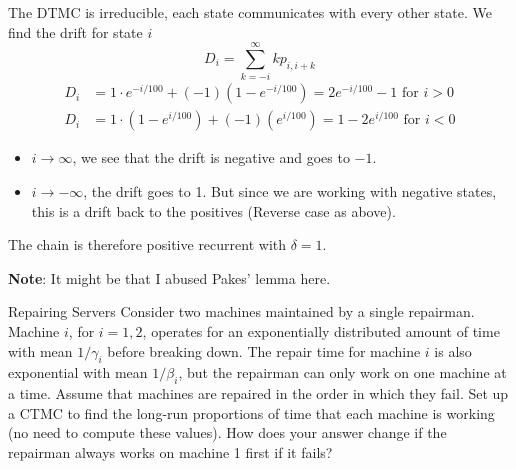 \begin{solution}
  The DTMC is irreducible, each state communicates with every other state. We find the drift for state $i$
  \[
    D_i=\sum_{k=-i}^\infty kp_{i,i+k}
  \]
  \begin{align*}
    D_i &= 1\cdot e^{-i/100}+(-1)(1-e^{-i/100}) = 2e^{-i/100} - 1  \text{ for } i > 0\\
    D_i &=1 \cdot (1-e^{i/100})+(-1)(e^{i/100}) = 1-2e^{i/100} \text{ for } i < 0
  \end{align*}

  \begin{itemize}
    \item $i\rightarrow \infty$, we see that the drift is negative and goes to $-1$.
    \item $i\rightarrow -\infty$, the drift goes to 1. But since we are working with negative states, this is a drift back to the positives (Reverse case as above).
  \end{itemize}
  The chain is therefore positive recurrent with $\delta = 1$.

  \textbf{Note}: It might be that I abused Pakes' lemma here.
\end{solution}

\begin{problem}{Repairing Servers}
Consider two machines maintained by a single repairman. Machine \( i \), for \( i = 1, 2 \), operates for an exponentially distributed amount of time with mean \( 1/\gamma_i \) before breaking down. The repair time for machine \( i \) is also exponential with mean \( 1/\beta_i \), but the repairman can only work on one machine at a time. Assume that machines are repaired in the order in which they fail. Set up a CTMC to find the long-run proportions of time that each machine is working (no need to compute these values). How does your answer change if the repairman always works on machine 1 first if it fails?
\end{problem}

